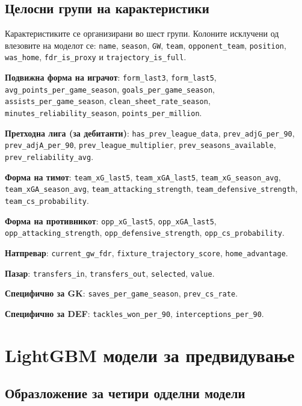 \subsection{Целосни групи на карактеристики}

Карактеристиките се организирани во шест групи. Колоните исклучени од влезовите на моделот се: \texttt{name}, \texttt{season}, \texttt{GW}, \texttt{team}, \texttt{opponent\_team}, \texttt{position}, \texttt{was\_home}, \texttt{fdr\_is\_proxy} и \texttt{trajectory\_is\_full}.

\textbf{Подвижна форма на играчот}: \texttt{form\_last3}, \texttt{form\_last5}, \texttt{avg\_points\_per\_game\_season}, \texttt{goals\_per\_game\_season}, \texttt{assists\_per\_game\_season}, \texttt{clean\_sheet\_rate\_season}, \texttt{minutes\_reliability\_season}, \texttt{points\_per\_million}.

\textbf{Претходна лига (за дебитанти)}: \texttt{has\_prev\_league\_data}, \texttt{prev\_adjG\_per\_90}, \texttt{prev\_adjA\_per\_90}, \texttt{prev\_league\_multiplier}, \texttt{prev\_seasons\_available}, \texttt{prev\_reliability\_avg}.

\textbf{Форма на тимот}: \texttt{team\_xG\_last5}, \texttt{team\_xGA\_last5}, \texttt{team\_xG\_season\_avg}, \texttt{team\_xGA\_season\_avg}, \texttt{team\_attacking\_strength}, \texttt{team\_defensive\_strength}, \texttt{team\_cs\_probability}.

\textbf{Форма на противникот}: \texttt{opp\_xG\_last5}, \texttt{opp\_xGA\_last5}, \texttt{opp\_attacking\_strength}, \texttt{opp\_defensive\_strength}, \texttt{opp\_cs\_probability}.

\textbf{Натпревар}: \texttt{current\_gw\_fdr}, \texttt{fixture\_trajectory\_score}, \texttt{home\_advantage}.

\textbf{Пазар}: \texttt{transfers\_in}, \texttt{transfers\_out}, \texttt{selected}, \texttt{value}.

\textbf{Специфично за GK}: \texttt{saves\_per\_game\_season}, \texttt{prev\_cs\_rate}.

\textbf{Специфично за DEF}: \texttt{tackles\_won\_per\_90}, \texttt{interceptions\_per\_90}.

\section{LightGBM модели за предвидување}

\subsection{Образложение за четири одделни модели}

